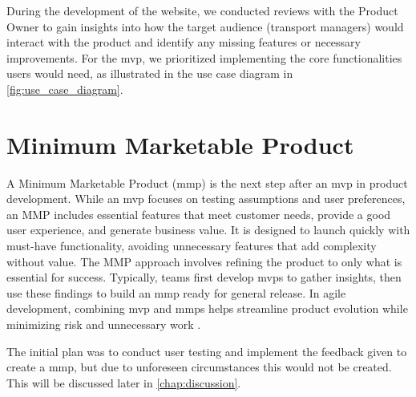 During the development of the website, we conducted reviews with the Product Owner to gain insights into how the target audience (transport managers) would interact with the product and identify any missing features or necessary improvements. For the \acrshort{mvp}, we prioritized implementing the core functionalities users would need, as illustrated in the use case diagram in \autoref{fig:use_case_diagram}.

\section{Minimum Marketable Product}

A Minimum Marketable Product (\acrshort{mmp}) is the next step after an \Gls{mvp} in product development. While an \acrshort{mvp} focuses on testing assumptions and user preferences, an MMP includes essential features that meet customer needs, provide a good user experience, and generate business value. It is designed to launch quickly with must-have functionality, avoiding unnecessary features that add complexity without value. The MMP approach involves refining the product to only what is essential for success. Typically, teams first develop \acrshort{mvp}s to gather insights, then use these findings to build an \acrshort{mmp} ready for general release. In agile development, combining \acrshort{mvp} and \acrshort{mmp}s helps streamline product evolution while minimizing risk and unnecessary work \cite{wanner_mmp}. 

The initial plan was to conduct user testing and implement the feedback given to create a \acrshort{mmp}, but due to unforeseen circumstances this would not be created. This will be discussed later in \autoref{chap:discussion}.
